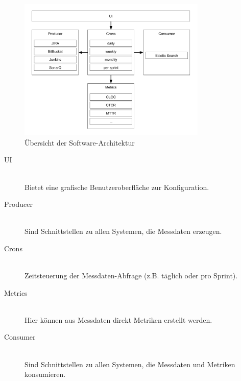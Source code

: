 \begin{savenotes}
    \begin{figure}[H] 
        \centering
            \includegraphics[width=0.8\textwidth]{img/architecture-overview.png}
        \caption{Übersicht der Software-Architektur}\label{fig:overview_architecture}
    \end{figure}
\end{savenotes}

\begin{description}
    \item[UI] \hfill \\ Bietet eine grafische Benutzeroberfläche zur Konfiguration.
    \item[Producer] \hfill \\ Sind Schnittstellen zu allen Systemen, die Messdaten erzeugen.
    \item[Crons] \hfill \\ Zeitsteuerung der Messdaten-Abfrage (z.B. täglich oder pro Sprint).
    \item[Metrics] \hfill \\ Hier können aus Messdaten direkt Metriken erstellt werden.
    \item[Consumer] \hfill \\ Sind Schnittstellen zu allen Systemen, die Messdaten und Metriken konsumieren.
\end{description}

